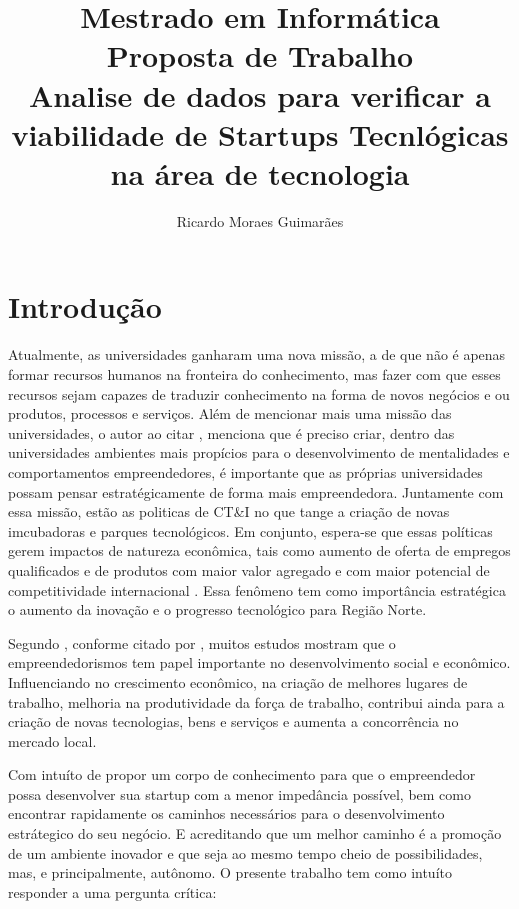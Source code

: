 \documentclass[12pt]{article}
\title{Mestrado em Informática\\ Proposta de Trabalho \\ Analise de dados para verificar a viabilidade de Startups Tecnlógicas na área de tecnologia}
\author{Ricardo Moraes Guimarães\inst{1}}
\begin{document}
\maketitle

\section{Introdução} \label{sec:intro}

Atualmente, as universidades ganharam uma nova missão, a de que não é apenas formar recursos humanos na fronteira do conhecimento, mas fazer com que esses recursos sejam capazes de traduzir conhecimento na forma de novos negócios e ou produtos, processos e serviços. Além de mencionar mais uma missão das universidades, o autor \cite{hannon2013entrepreneurial:2013} ao citar \cite{gibb2012exploring:2012}, menciona que é preciso criar, dentro das universidades ambientes mais propícios para o desenvolvimento de mentalidades e comportamentos empreendedores, é importante que as próprias universidades possam pensar estratégicamente de forma mais empreendedora.
Juntamente com essa missão, estão as politicas de CT\&I no que tange a criação de novas imcubadoras e parques tecnológicos. Em conjunto, espera-se que essas políticas gerem impactos de natureza econômica, tais como aumento de oferta de empregos qualificados e de produtos com maior valor agregado e com maior potencial de competitividade internacional \cite{hannon2013entrepreneurial:2013}. Essa fenômeno tem como importância estratégica o aumento da inovação e o progresso tecnológico \cite{hannon2013entrepreneurial:2013} para Região Norte.

Segundo \cite{dimitriadis2008opinia:2008}, conforme citado por \cite{staniewski2015motivating:2015}, muitos estudos mostram que o empreendedorismos tem papel importante no desenvolvimento social e econômico. Influenciando no crescimento econômico, na criação de melhores lugares de trabalho, melhoria na produtividade da força de trabalho, contribui ainda para a criação de novas tecnologias, bens e serviços e aumenta a concorrência no mercado local.

Com intuíto de propor um corpo de conhecimento para que o empreendedor possa desenvolver sua startup com a menor impedância possível, bem como encontrar rapidamente os caminhos necessários para o desenvolvimento estrátegico do seu negócio. E acreditando que um melhor caminho é a promoção de um ambiente inovador e que seja ao mesmo tempo cheio de possibilidades, mas, e principalmente, autônomo. O presente trabalho tem como intuíto responder a uma pergunta crítica:
\end{document}
